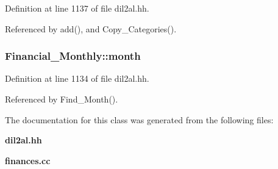 Definition at line 1137 of file dil2al.hh.

Referenced by add(), and Copy\_\-Categories().
\subsubsection{ Financial\_\-Monthly::month\hspace{0.3cm}{\tt  [protected]}}\label{classFinancial__Monthly_n0}




Definition at line 1134 of file dil2al.hh.

Referenced by Find\_\-Month().

The documentation for this class was generated from the following files:\begin{CompactItemize}
\item 
{\bf dil2al.hh}\item 
{\bf finances.cc}\end{CompactItemize}
